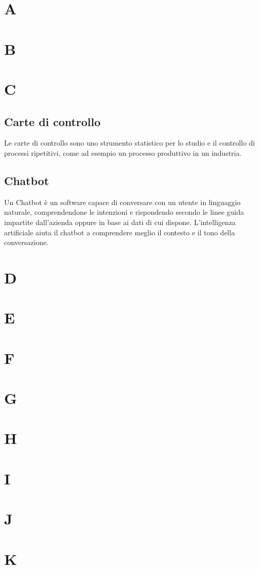 \section{A}
\section{B}
\section{C}
\subsection{Carte di controllo}
Le carte di controllo sono uno strumento statistico per lo studio e il controllo di processi ripetitivi, come ad esempio un processo produttivo in un industria.
\subsection{Chatbot}
Un Chatbot è un software capace di conversare con un utente in linguaggio naturale, comprendendone 
le intenzioni e rispondendo secondo le linee guida impartite dall'azienda oppure in 
base ai dati di cui dispone. L'intelligenza artificiale aiuta il chatbot a comprendere meglio il 
contesto e il tono della conversazione.
\newpage
\section{D}
\section{E}
\section{F}
\section{G}
\section{H}
\section{I}
\section{J}
\section{K}
